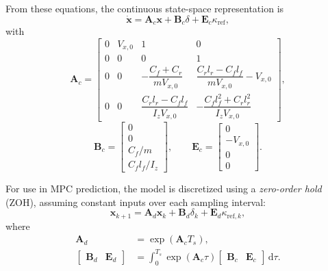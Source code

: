 \documentclass[12pt,a4paper]{report}
\begin{document}
From these equations, the continuous state-space representation is
%
\begin{equation}
    \dot{\mathbf{x}}
    =
    \mathbf{A}_c\mathbf{x}
    + \mathbf{B}_c\delta
    + \mathbf{E}_c\kappa_{\mathrm{ref}},
    \label{eq:bicycle_continuous}
\end{equation}
%
with
%
\begin{equation}
    \mathbf{A}_c =
    \begin{bmatrix}
        0 & V_{x,0} & 1 & 0 \\
        0 & 0 & 0 & 1 \\
        0 & 0
          & -\dfrac{C_f+C_r}{mV_{x,0}}
          & \dfrac{C_rl_r-C_fl_f}{mV_{x,0}}-V_{x,0} \\
        0 & 0
          & \dfrac{C_rl_r-C_fl_f}{I_zV_{x,0}}
          & -\dfrac{C_fl_f^2+C_rl_r^2}{I_zV_{x,0}}
    \end{bmatrix},
    \label{eq:bicycle_Ac}
\end{equation}
%
\begin{equation}
    \mathbf{B}_c =
    \begin{bmatrix}
        0 \\
        0 \\
        C_f/m \\
        C_fl_f/I_z
    \end{bmatrix},
    \qquad
    \mathbf{E}_c =
    \begin{bmatrix}
        0 \\
        -V_{x,0} \\
        0 \\
        0
    \end{bmatrix}.
    \label{eq:bicycle_Bc_Ec}
\end{equation}

For use in MPC prediction, the model is discretized using a \textit{zero-order hold} (ZOH), assuming constant inputs over each sampling interval:
%
\begin{equation}
    \mathbf{x}_{k+1}
    =
    \mathbf{A}_d\mathbf{x}_k
    + \mathbf{B}_d\delta_k
    + \mathbf{E}_d\kappa_{\mathrm{ref},k},
    \label{eq:bicycle_discrete}
\end{equation}
%
where
%
\begin{align}
    \mathbf{A}_d
    &= \exp\left(\mathbf{A}_cT_s\right),
    \label{eq:bicycle_Ad}\\
    \begin{bmatrix}
        \mathbf{B}_d & \mathbf{E}_d
    \end{bmatrix}
    &=
    \int_0^{T_s}
        \exp\left(\mathbf{A}_c\tau\right)
        \begin{bmatrix}
            \mathbf{B}_c & \mathbf{E}_c
        \end{bmatrix}
    \,\mathrm{d}\tau.
    \label{eq:bicycle_Bd_Ed}
\end{align}
\end{document}
